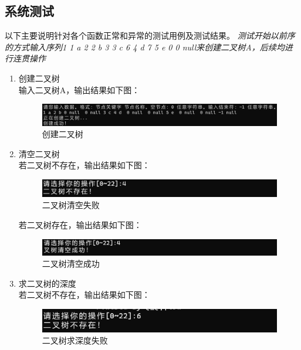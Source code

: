 \documentclass[supercite]{Experimental_Report}
\theoremstyle{definition}
\begin{document}
\subsection{系统测试}
以下主要说明针对各个函数正常和异常的测试用例及测试结果。
\emph{测试开始以前序的方式输入序列1 1 a  2 2 b   3 3 c  6 4 d  7 5 e  0 0 null来创建二叉树A，后续均进行连贯操作}
\begin{enumerate}
	\item 创建二叉树\\
	输入二叉树A，输出结果如下图：
\begin{figure}[htbp]
	\centering
	\begin{minipage}{0.7\linewidth}
		\centering
		\includegraphics[width=0.9\linewidth]{images/创建二叉树.png}
	\end{minipage}
	\caption{创建二叉树}
	\label{fig2-8}
\end{figure}
	\item 清空二叉树\\
	若二叉树不存在，输出结果如下图：
	\begin{figure}[htbp]
		\centering
		\begin{minipage}{0.7\linewidth}
			\centering
			\includegraphics[width=0.9\linewidth]{images/二叉树清空失败.png}
		\end{minipage}
		\caption{二叉树清空失败}
		\label{fig2-9}
	\end{figure}

	若二叉树存在，输出结果如下图：
	\begin{figure}[htbp]
		\centering
		\begin{minipage}{0.7\linewidth}
			\centering
			\includegraphics[width=0.9\linewidth]{images/二叉树清空成功.png}
		\end{minipage}
		\caption{二叉树清空成功}
		\label{fig2-10}
	\end{figure}
	\item 求二叉树的深度\\
	若二叉树不存在，输出结果如下图：
	\begin{figure}[htbp]
		\centering
		\begin{minipage}{0.7\linewidth}
			\centering
			\includegraphics[width=0.9\linewidth]{images/求深度失败.png}
		\end{minipage}
		\caption{二叉树求深度失败}
		\label{fig2-11}
	\end{figure}


\end{enumerate}
\end{document}
